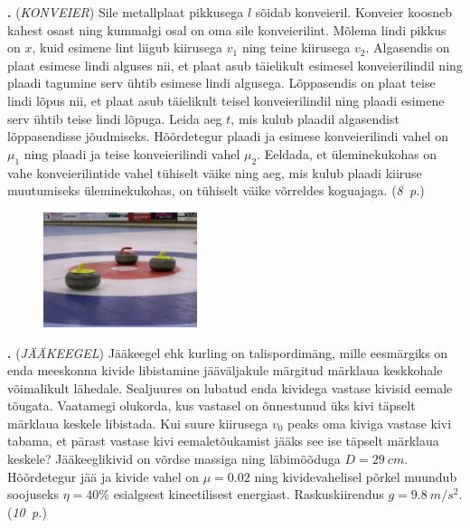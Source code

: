 \documentclass[12pt,a5paper]{article}
\newcommand{\numb}[1]{\vspace{5pt}\textbf{\large #1}}
\newcommand{\nimi}[1]{(\textsl{\small #1})}
\newcommand{\punktid}[1]{(\emph{#1~p.})}
\newcounter{ylesanne}
\newcommand{\yl}[1]{\addtocounter{ylesanne}{1}\numb{\theylesanne.} \nimi{#1} \newblock{}}
\begin{document}
\yl{KONVEIER} Sile metallplaat pikkusega $l$ sõidab konveieril. Konveier koosneb kahest osast ning kummalgi osal on oma sile konveierilint. Mõlema lindi pikkus on $x$, kuid esimene lint liigub kiirusega $v_1$ ning teine kiirusega $v_2$. Algasendis on plaat esimese lindi alguses nii, et plaat asub täielikult esimesel konveierilindil ning plaadi tagumine serv ühtib esimese lindi algusega. Lõppasendis on plaat teise lindi lõpus nii, et plaat asub täielikult teisel konveierilindil ning plaadi esimene serv ühtib teise lindi lõpuga. Leida aeg $t$, mis kulub plaadil algasendist lõppasendisse jõudmiseks. Hõõrdetegur plaadi ja esimese konveierilindi vahel on $\mu_{1}$ ning plaadi ja teise konveierilindi vahel $\mu_{2}$. Eeldada, et üleminekukohas on vahe konveierilintide vahel tühiselt väike ning aeg, mis kulub plaadi kiiruse muutumiseks üleminekukohas, on tühiselt väike võrreldes koguajaga. \punktid{8}



\begin{figure}
  \vspace{-25pt}
  \begin{center}
    \includegraphics[width=0.4\textwidth]{Curling_stones.jpg}
  \end{center}
  \vspace{-20pt}
\end{figure}

\yl{JÄÄKEEGEL} Jääkeegel ehk kurling on talispordimäng, mille eesmärgiks on enda meeskonna kivide libistamine jääväljakule märgitud märklaua keskkohale võimalikult lähedale. Sealjuures on lubatud enda kividega vastase kivisid eemale tõugata. Vaatamegi olukorda, kus vastasel on õnnestunud üks kivi täpselt märklaua keskele libistada. Kui suure kiirusega $v_0$ peaks oma kiviga vastase kivi tabama, et pärast vastase kivi eemaletõukamist jääks see ise täpselt märklaua keskele? Jääkeeglikivid on võrdse massiga ning läbimõõduga $D=\SI{29}{cm}$. Hõõrdetegur jää ja kivide vahel on $\mu = \num{0.02}$ ning kividevahelisel põrkel muundub soojuseks $\eta=40\%$ esialgsest kineetilisest energiast. Raskuskiirendus $g=\SI{9.8}{m/s^2}$.
\punktid{10}
\end{document}
